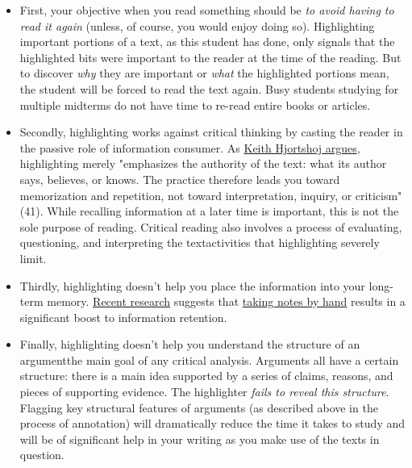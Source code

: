 \begin{itemize}

\item First, your objective when you read something should be \emph{to avoid having to read it again} (unless, of course, you would enjoy doing so). Highlighting important portions of a text, as this student has done, only signals that the highlighted bits were important to the reader at the time of the reading. But to discover \emph{why} they are important or \emph{what} the highlighted portions mean, the student will be forced to read the text again. Busy students studying for multiple midterms do not have time to re-read entire books or articles.  

\item Secondly, highlighting works against critical thinking by casting the reader in the passive role of information consumer. As \href{http://libcat.dartmouth.edu/record=6773185}{Keith Hjortshoj argues}, highlighting merely "emphasizes the authority of the text: what its author says, believes, or knows. The practice therefore leads you toward memorization and repetition, not toward interpretation, inquiry, or criticism" (41). While recalling information at a later time is important, this is not the sole purpose of reading. Critical reading also involves a process of evaluating, questioning, and interpreting the text\textemdash activities that highlighting severely limit.

\item Thirdly, highlighting doesn't help you place the information into your long-term memory. \href{https://sites.udel.edu/victorp/files/2010/11/Psychological-Science-2014-Mueller-0956797614524581-1u0h0yu.pdf}{Recent  
research} suggests that \href{https://www.scientificamerican.com/article/a-learning-secret-don-t-take-notes-with-a-laptop/}{taking notes by hand} results in a significant boost to information retention.

\item Finally, highlighting doesn't help you understand the structure of an argument\textemdash the main goal of any critical analysis. Arguments all have a certain structure: there is a main idea supported by a series of claims, reasons, and pieces of supporting evidence. The highlighter \emph{fails to reveal this structure}. Flagging key structural features of arguments (as described above in the process of annotation) will dramatically reduce the time it takes to study and will be of significant help in your writing as you make use of the texts in question.

\end{itemize}

